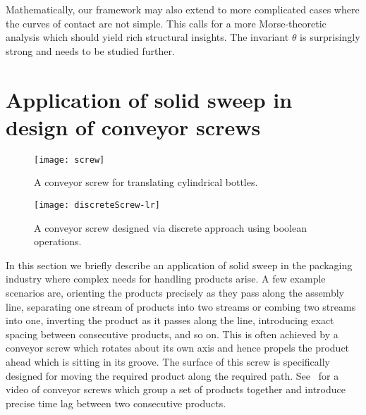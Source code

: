 \documentclass{elsart5p}
\newcommand{\eat}[1]{}
\begin{document}
Mathematically, our framework may also extend to more complicated cases
where the curves of contact are not simple. This calls for a more
Morse-theoretic analysis which should yield rich structural insights. The
invariant $\theta $ is surprisingly strong and needs to be studied
further.
\eat{
In this paper we give a complete characterization of the trim curves using 
decomposability and the zero-locus of the function $\theta$.  
While the trim curves in decomposable sweeps can be computed by the existing 
surface-surface intersection algorithms, in non-decomposable sweeps 
this approach fails in the neighborhood of singular trim points.  We address this 
problem via the zero-locus of the function $\theta$.
We give examples of simple, decomposable and non-decomposable to illustrate this. 

This work can be extended by computing the complete brep for the envelope which 
includes orienting the edges and faces of ${\cal E}$, computing adjacency relations between them, 
and so on.  The case when faces of $M$ do not meet smoothly needs to be addressed.  
Sweeps in which the number of components of curve of contact changes with time also poses an 
interesting problem.
}

\appendix

\section{Application of solid sweep in design of conveyor screws}

\begin{figure}
 \centering
 \texttt{[image: screw]}
 \caption{A conveyor screw for translating cylindrical bottles.}
 \label{screwFig}
\end{figure}

\begin{figure}
 \centering
 \texttt{[image: discreteScrew-lr]}
 \caption{A conveyor screw designed via discrete approach using boolean operations.}
 \label{discreteScrewFig}
\end{figure}

In this section we briefly describe an application of solid sweep in the packaging industry 
where complex needs for handling products arise.  A few example scenarios are, orienting 
the products precisely as they pass along the assembly line, separating one stream of products 
into two streams or combing two streams into one, inverting the product as it passes along the line, 
introducing exact spacing between consecutive products, and so on. 
This is often achieved by a conveyor screw which rotates about its own axis and hence 
propels the product ahead which is sitting in its groove.
The surface of this screw is specifically designed for moving the required product 
along the required path.  See~\cite{scroll} for a video 
of conveyor screws which group a set of products together and introduce precise time lag between 
two consecutive products. 
\end{document}
